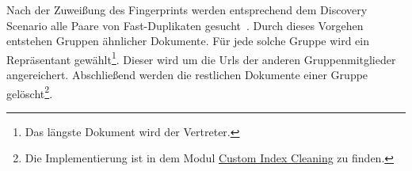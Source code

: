 Nach der Zuweißung des Fingerprints werden entsprechend dem Discovery Scenario alle Paare von Fast-Duplikaten
gesucht~\cite{croft.chap3}. Durch dieses Vorgehen entstehen Gruppen ähnlicher Dokumente.
Für jede solche Gruppe wird ein Repräsentant gewählt\footnote{Das längste Dokument wird der Vertreter.}.
Dieser wird um die Urls der anderen Gruppenmitglieder angereichert.
Abschließend werden die restlichen Dokumente einer Gruppe gelöscht\footnote{Die Implementierung ist in dem Modul 
\href{https://github.com/mam10eks/search-homepage-of-university-leipzig/tree/master/custom-index-cleaning}
{Custom Index Cleaning} zu finden.}.
